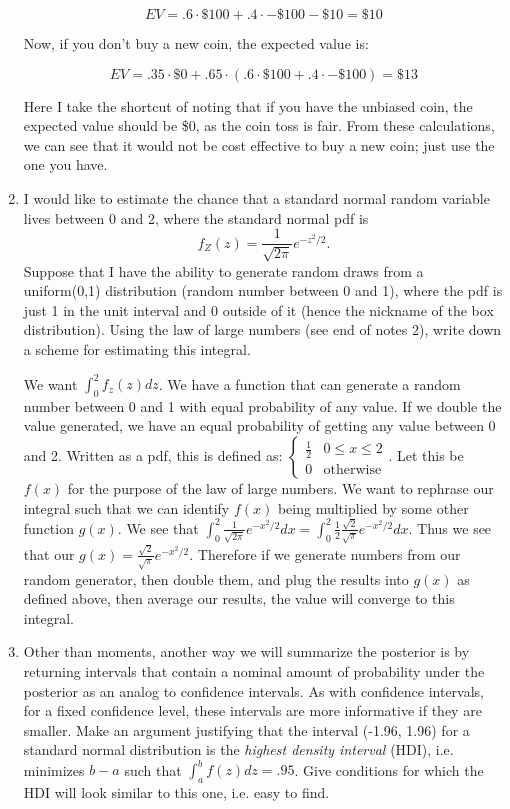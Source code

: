 \documentclass{article}
\begin{document}
\begin{enumerate}
$$EV = .6 \cdot \$100 + .4 \cdot -\$100 - \$10 = \$10$$

Now, if you don't buy a new coin, the expected value is:

$$EV = .35 \cdot \$0 + .65 \cdot (.6 \cdot \$100 + .4 \cdot -\$100) = \$13$$

Here I take the shortcut of noting that if you have the unbiased coin, the expected value should be \$0, as the coin toss is fair. From these calculations, we can see that it would not be cost effective to buy a new coin; just use the one you have.

\item I would like to estimate the chance that a standard normal random variable lives between 0 and 2, where the standard normal pdf is 
$$f_Z(z)=\frac{1}{\sqrt{2\pi}}e^{-z^2/2}.$$
Suppose that I have the ability to generate random draws from a uniform(0,1) distribution (random number between 0 and 1), where the pdf is just 1 in the unit interval and 0 outside of it (hence the nickname of the box distribution).  Using the law of large numbers (see end of notes 2), write down a scheme for estimating this integral.

We want $\int_{0}^{2} f_z(z)dz$. We have a function that can generate a random number between 0 and 1 with equal probability of any value. If we double the value generated, we have an equal probability of getting any value between 0 and 2. Written as a pdf, this is defined as:
$\begin{cases} 
\frac{1}{2} & 0\leq x\leq 2 \\ 0 & \text{otherwise}
\end{cases}$.
Let this be $f(x)$ for the purpose of the law of large numbers. We want to rephrase our integral such that we can identify $f(x)$ being multiplied by some other function $g(x)$. We see that $\int_{0}^{2} \frac{1}{\sqrt{2\pi}}e^{-x^2/2}dx = \int_{0}^{2}\frac{1}{2} \frac{\sqrt2}{\sqrt{\pi}}e^{-x^2/2}dx$. Thus we see that our $g(x) = \frac{\sqrt2}{\sqrt{\pi}}e^{-x^2/2}$. Therefore if we generate numbers from our random generator, then double them, and plug the results into $g(x)$ as defined above, then average our results, the value will converge to this integral. 


\item  Other than moments, another way we will summarize the posterior is by returning intervals that contain a nominal amount of probability under the posterior as an analog to confidence intervals.  As with confidence intervals, for a fixed confidence level, these intervals are more informative if they are smaller.  Make an argument justifying that the interval (-1.96, 1.96) for a standard normal distribution is the {\it highest density interval} (HDI), i.e. minimizes $b-a$ such that $\int_a^bf(z)dz=.95$.  Give conditions for which the HDI will look similar to this one, i.e. easy to find. 	
\end{enumerate}
\end{document}
